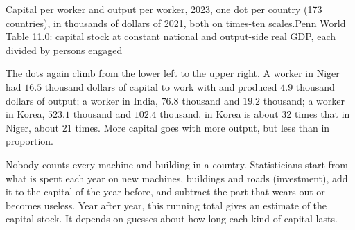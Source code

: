 \begin{omchart}{Capital per worker and output per worker, 2023, one dot per country (173
countries), in thousands of dollars of 2021, both on times-ten scales.}{Penn World Table 11.0:
capital stock at constant national  and output-side real GDP, each divided by persons
engaged}
\end{omchart}

The dots again climb from the lower left to the upper right. A worker in Niger had $16.5$
thousand dollars of capital to work with and produced $4.9$ thousand dollars of output; a worker
in India, $76.8$ thousand and $19.2$ thousand; a worker in Korea, $523.1$ thousand and $102.4$
thousand.  in Korea is about 32 times that in Niger,  about 21
times. More capital goes with more output, but less than in proportion.

\begin{measure}
Nobody counts every machine and building in a country. Statisticians start from what is spent
each year on new machines, buildings and roads (investment), add it to the capital of the year
before, and subtract the part that wears out or becomes useless. Year after year, this running
total gives an estimate of the capital stock. It depends on guesses about how long each kind of
capital lasts.
\end{measure}

